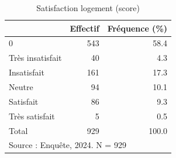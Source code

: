 \begin{table}[htbp]\centering
\def\sym#1{\ifmmode^{#1}\else\(^{#1}\)\fi}
\caption{Satisfaction logement (score)}
\begin{tabular}{l*{2}{r}}
\toprule
            &    Effectif&Fréquence (\%)\\
\midrule
0           &         543&        58.4\\
Très insatisfait&          40&         4.3\\
Insatisfait &         161&        17.3\\
Neutre      &          94&        10.1\\
Satisfait   &          86&         9.3\\
Très satisfait&           5&         0.5\\
Total       &         929&       100.0\\
\bottomrule
\multicolumn{3}{l}{\footnotesize Source : Enquête, 2024. N = 929}\\
\end{tabular}
\end{table}

